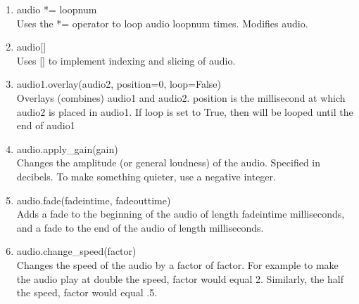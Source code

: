 \documentclass[11pt, letterpaper, onecolumn, oneside, final]{article}
\begin{document}
\begin{enumerate}
\begin{enumerate}
        \item {\consolas audio *= loopnum} \\
        \hspace*{8mm}Uses the *= operator to loop {\consolas audio loopnum} times. Modifies audio.
        
        \item {\consolas audio[]} \\
        \hspace*{8mm}Uses [] to implement indexing and slicing of audio.
        
        \item {\consolas audio1.overlay(audio2, position=0, loop=False)} \\
        \hspace*{8mm}Overlays (combines) {\consolas audio1} and {\consolas audio2}. {\consolas position} is the millisecond 
        \hspace*{8mm}at which {\consolas audio2} is placed in {\consolas audio1}. If {\consolas loop} is set to True, then 
        \hspace*{8mm}{\consolas audio2} will be looped until the end of {\consolas audio1}
        
        \item {\consolas audio.apply\_gain(gain)} \\
        \hspace*{8mm}Changes the amplitude (or general loudness) of the audio. 
        \hspace*{8mm}Specified in decibels. To make something quieter, use a negative integer. 
        
        \item {\consolas audio.fade(fadeintime, fadeouttime)} \\
        \hspace*{8mm}Adds a fade to the beginning of the audio of length {\consolas fadeintime} \hspace*{8mm}milliseconds, and a fade to the end of the audio of length
        \hspace*{8mm}{\consolas fadeouttime} milliseconds.
        
        \item {\consolas audio.change\_speed(factor)} \\
        \hspace*{8mm}Changes the speed of the audio by a factor of {\consolas factor}. For example 
        \hspace*{8mm}to make the audio play at double the speed, {\consolas factor} would equal 2. 
        \hspace*{8mm}Similarly, the half the speed, {\consolas factor} would equal .5.
        

\end{enumerate}
\end{enumerate}
\end{document}
